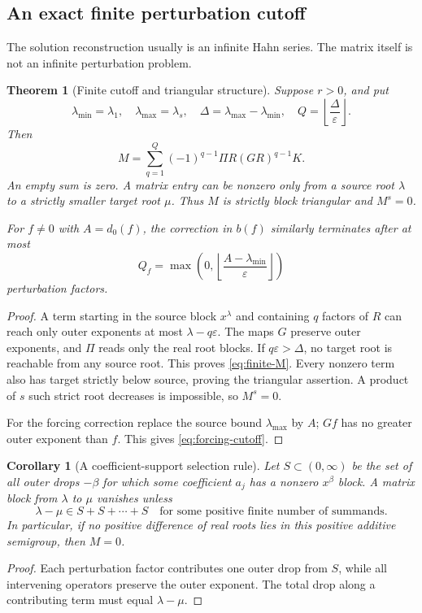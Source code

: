 \documentclass[11pt,a4paper]{article}
\numberwithin{equation}{section}
\newtheorem{theorem}{Theorem}[section]
\newtheorem{corollary}[corollary]{Corollary}
\theoremstyle{definition}
\theoremstyle{remark}
\newcommand{\dprim}{d_0}
\newcommand{\eps}{\varepsilon}
\begin{document}
\subsection{An exact finite perturbation cutoff}
The solution reconstruction usually is an infinite Hahn series. The matrix itself is not an infinite perturbation problem.

\begin{theorem}[Finite cutoff and triangular structure]
\label{thm:cutoff}
Suppose $r>0$, and put
\[
 \lambda_{\min}=\lambda_1,\quad\lambda_{\max}=\lambda_s,
 \quad\Delta=\lambda_{\max}-\lambda_{\min},
 \quad Q=\left\lfloor\frac{\Delta}{\eps}\right\rfloor.
\]
Then
\begin{equation}
 M=\sum_{q=1}^{Q}(-1)^{q-1}\Pi R(GR)^{q-1}K.
 \label{eq:finite-M}
\end{equation}
An empty sum is zero. A matrix entry can be nonzero only from a source root $\lambda$ to a strictly smaller target root $\mu$. Thus $M$ is strictly block triangular and $M^s=0$.

For $f\ne0$ with $A=\dprim(f)$, the correction in $b(f)$ similarly terminates after at most
\begin{equation}
 Q_f=\max\left(0,\left\lfloor\frac{A-\lambda_{\min}}{\eps}\right\rfloor\right)
 \label{eq:forcing-cutoff}
\end{equation}
perturbation factors.
\end{theorem}
\begin{proof}
A term starting in the source block $x^\lambda$ and containing $q$ factors of $R$ can reach only outer exponents at most $\lambda-q\eps$. The maps $G$ preserve outer exponents, and $\Pi$ reads only the real root blocks. If $q\eps>\Delta$, no target root is reachable from any source root. This proves \eqref{eq:finite-M}. Every nonzero term also has target strictly below source, proving the triangular assertion. A product of $s$ such strict root decreases is impossible, so $M^s=0$.

For the forcing correction replace the source bound $\lambda_{\max}$ by $A$; $Gf$ has no greater outer exponent than $f$. This gives \eqref{eq:forcing-cutoff}.
\end{proof}

\begin{corollary}[A coefficient-support selection rule]
\label{cor:selection}
Let $S\subset(0,\infty)$ be the set of all outer drops $-\beta$ for which some coefficient $a_j$ has a nonzero $x^\beta$ block. A matrix block from $\lambda$ to $\mu$ vanishes unless
\begin{equation}
 \lambda-\mu\in S+S+\cdots+S
 \quad\text{for some positive finite number of summands}.
 \label{eq:selection}
\end{equation}
In particular, if no positive difference of real roots lies in this positive additive semigroup, then $M=0$.
\end{corollary}
\begin{proof}
Each perturbation factor contributes one outer drop from $S$, while all intervening operators preserve the outer exponent. The total drop along a contributing term must equal $\lambda-\mu$.
\end{proof}
\end{document}
